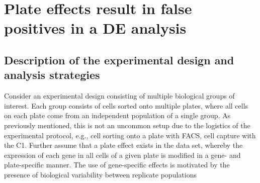 \documentclass[oupdraft]{bio}
\begin{document}
\section{Plate effects result in false positives in a DE analysis}

\subsection{Description of the experimental design and analysis strategies}
Consider an experimental design consisting of multiple biological groups of interest.
Each group consists of cells sorted onto multiple plates, where all cells on each plate come from an independent population of a single group.
As previously mentioned, this is not an uncommon setup due to the logistics of the experimental protocol, e.g., cell sorting onto a plate with FACS, cell capture with the C1.
Further assume that a plate effect exists in the data set, whereby the expression of each gene in all cells of a given plate is modified in a gene- and plate-specific manner.
The use of gene-specific effects is motivated by the presence of biological variability between replicate populations
\end{document}
